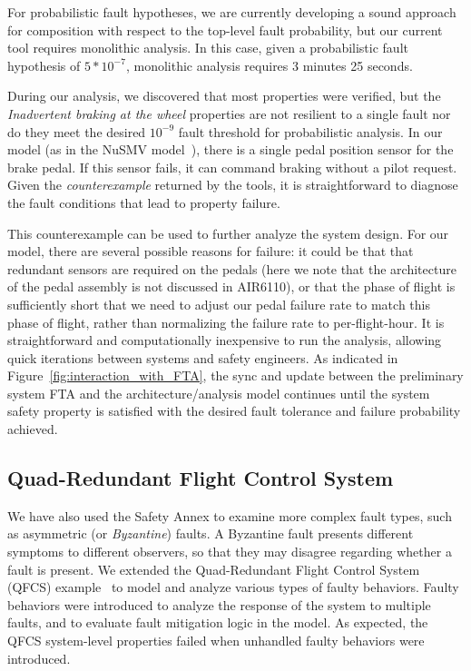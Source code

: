 For probabilistic fault hypotheses, we are currently developing a sound approach for composition with respect to the top-level fault probability, but our current tool requires monolithic analysis.  In this case, given a probabilistic fault hypothesis of $5*10^{-7}$, monolithic analysis requires 3 minutes 25 seconds.

During our analysis, we discovered that most properties were verified, but the \textit{Inadvertent braking at the wheel} properties are not resilient to a single fault nor do they meet the desired $10^{-9}$ fault threshold for probabilistic analysis.  In our model (as in the NuSMV model~\cite{DBLP:conf/cav/BozzanoCPJKPRT15}), there is a single pedal position sensor for the brake pedal.  If this sensor fails, it can command braking without a pilot request.  Given the {\em counterexample} returned by the tools, it is straightforward to diagnose the fault conditions that lead to property failure.

This counterexample can be used to further analyze the system design.  For our model, there are several possible reasons for failure: it could be that that redundant sensors are required on the pedals (here we note that the architecture of the pedal assembly is not discussed in AIR6110), or that the phase of flight is sufficiently short that we need to adjust our pedal failure rate to match this phase of flight, rather than normalizing the failure rate to per-flight-hour.  It is straightforward and computationally inexpensive to run the analysis, allowing quick iterations between systems and safety engineers. As indicated in Figure~\ref{fig:interaction_with_FTA}, the sync and update between the preliminary system FTA and the architecture/analysis model continues until the system safety property is satisfied with the desired fault tolerance and failure probability achieved.




\subsection{Quad-Redundant Flight Control System}
We have also used the Safety Annex to examine more complex fault types, such as asymmetric (or {\em Byzantine}) faults.  A Byzantine fault presents different symptoms to different observers, so that they may disagree regarding whether a fault is present.
We extended the Quad-Redundant Flight Control System (QFCS) example~\cite{QFCS15:backes} to model and analyze various types of faulty behaviors. Faulty behaviors were introduced to analyze the response of the system to multiple faults, and to evaluate fault mitigation logic in the model. As expected, the QFCS system-level properties failed when unhandled faulty behaviors were introduced.

